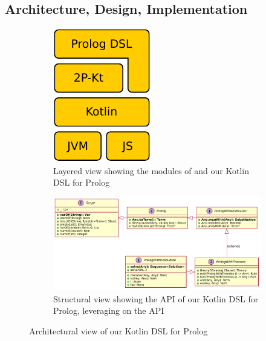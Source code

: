 \documentclass[12pt,a4paper,openright,twoside]{book}
\begin{document}
\subsection{Architecture, Design, Implementation}

\begin{figure}
    \centering
    \begin{subfigure}{.24\linewidth}
        \centering
        \includegraphics[width=.5\linewidth]{figures/layers}
        \caption{Layered view showing the modules of \twopkt{} and our Kotlin DSL for Prolog}
        \label{fig:layers}
    \end{subfigure}
    \hfill
    \begin{subfigure}{.75\linewidth}
        \includegraphics[width=\linewidth]{figures/dsl-types}
        \caption{Structural view showing the API of our Kotlin DSL for Prolog, leveraging on the \twopkt{} API}
        \label{fig:dsl-types}
    \end{subfigure}
    \caption{Architectural view of our Kotlin DSL for Prolog}
\end{figure}
\end{document}
